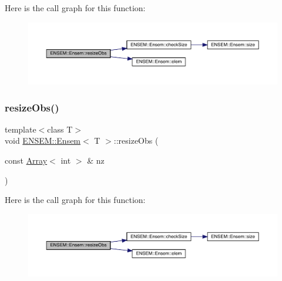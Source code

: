 Here is the call graph for this function\+:
\nopagebreak
\begin{figure}[H]
\begin{center}
\leavevmode
\includegraphics[width=350pt]{d7/d3e/classENSEM_1_1Ensem_a4acf05018e5c49c0053dbe8cf76a4252_cgraph}
\end{center}
\end{figure}
\mbox{\label{classENSEM_1_1Ensem_a4acf05018e5c49c0053dbe8cf76a4252}} 
\subsubsection{\texorpdfstring{resizeObs()}{resizeObs()}\hspace{0.1cm}{\footnotesize\ttfamily [8/8]}}
{\footnotesize\ttfamily template$<$class T$>$ \\
void \mbox{\hyperlink{classENSEM_1_1Ensem}{E\+N\+S\+E\+M\+::\+Ensem}}$<$ T $>$\+::resize\+Obs (\begin{DoxyParamCaption}\item[{const \mbox{\hyperlink{classXMLArray_1_1Array}{Array}}$<$ int $>$ \&}]{nz }\end{DoxyParamCaption})\hspace{0.3cm}{\ttfamily [inline]}}

Here is the call graph for this function\+:
\nopagebreak
\begin{figure}[H]
\begin{center}
\leavevmode
\includegraphics[width=350pt]{d7/d3e/classENSEM_1_1Ensem_a4acf05018e5c49c0053dbe8cf76a4252_cgraph}
\end{center}
\end{figure}
\mbox{\label{classENSEM_1_1Ensem_a5fdfac362fd4347e4383b4e0a8537aec}} 
